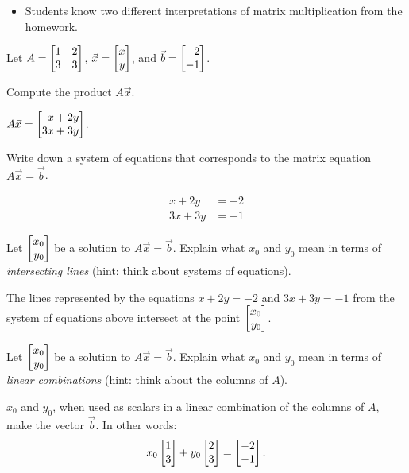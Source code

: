 \documentclass{workbook}
\begin{document}
\begin{slide}
\begin{annotation}
		\begin{notes}
			\begin{itemize}
				\item Students know two different interpretations of matrix multiplication from
					the homework.
			\end{itemize}
		\end{notes}
	\end{annotation}
	Let $A=\mat{1&2\\3&3}$, $\vec x=\mat{x\\y}$, and $\vec b=\mat{-2\\-1}$.
	\begin{parts}
		\item Compute the product $A\vec x$.
			\begin{solution}
				$A \vec x = \mat{x+2y\\3x+3y}$.
			\end{solution}
		\item Write down a system of equations that corresponds to the matrix equation
			$A\vec x=\vec b$.
			\begin{solution}
				\begin{align*}
					x + 2y &= -2 \\
					3x + 3y &= -1
				\end{align*}
			\end{solution}
		\item Let $\mat{x_0\\y_0}$ be a solution to $A\vec x=\vec b$. Explain what
			$x_0$ and $y_0$ mean in terms of \emph{intersecting lines} (hint: think
			about systems of equations).
			\begin{solution}
				The lines represented by the equations $x+2y=-2$ and $3x+3y=-1$
				from the system of equations above intersect at the point $\mat{x_0\\y_0}$.
			\end{solution}
		\item Let $\mat{x_0\\y_0}$ be a solution to $A\vec x=\vec b$. Explain what
			$x_0$ and $y_0$ mean in terms of \emph{linear combinations} (hint: think
			about the columns of $A$).
			\begin{solution}
				$x_0$ and $y_0$, when used as scalars in a linear combination of
				the columns of $A$, make the vector $\vec b$. In other words:
				\[
					x_0 \mat{1\\3} + y_0 \mat{2\\3} = \mat{-2\\-1}.
				\]
			\end{solution}
	\end{parts}
\end{slide}
\end{document}
